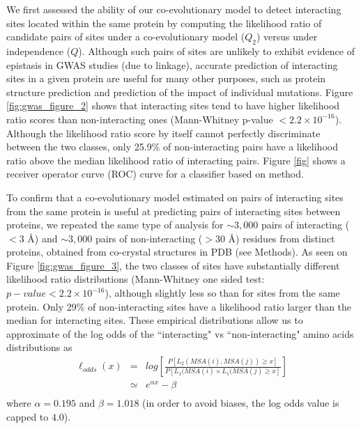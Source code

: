 We first assessed the ability of our co-evolutionary model to detect interacting sites located within the same protein by computing the likelihood ratio of candidate pairs of sites under a co-evolutionary model ($Q_2$) versus under independence ($Q$). 
Although such pairs of sites are unlikely to exhibit evidence of epistasis in GWAS studies (due to linkage), accurate prediction of interacting sites in a given protein are useful for many other purposes, such as protein structure prediction and prediction of the impact of individual mutations.  
Figure \ref{fig:gwas_figure_2} shows that interacting sites tend to have higher likelihood ratio scores than non-interacting ones (Mann-Whitney p-value $< 2.2 \times 10^{-16}$). 
Although the likelihood ratio score by itself cannot perfectly discriminate between the two classes, only 25.9\% of non-interacting pairs have a likelihood ratio above the median likelihood ratio of interacting pairs. 
Figure \ref{fig} shows a receiver operator curve (ROC) curve for a classifier based on method.




To confirm that a co-evolutionary model estimated on pairs of interacting sites from the same protein is useful at predicting pairs of interacting sites between proteins, we repeated the same type of analysis for $\sim3,000$ pairs of interacting ($< 3$ \r{A}) and $\sim3,000$ pairs of non-interacting ($>30$ \r{A}) residues from distinct proteins, obtained from co-crystal structures in PDB (see Methods). 
As seen on Figure \ref{fig:gwas_figure_3}, the two classes of sites have substantially different likelihood ratio distributions (Mann-Whitney one sided test: $p-value < 2.2 \times 10^{-16}$), although slightly less so than for sites from the same protein. Only 29\% of non-interacting sites have a likelihood ratio larger than the median for interacting sites. 
These empirical distributions allow us to approximate of the log odds of the ``interacting" vs ``non-interacting" amino acids distributions as
\begin{eqnarray*}
\ell_{odds}(x) & = & log\left[ \frac{P[ L_2(MSA(i), MSA(j)) \ge x ]}{P[ L_1(MSA(i) \times L_1(MSA(j) \ge x]} \right] \\
    & \simeq &e^{\alpha x}- \beta \\
\end{eqnarray*}
\noindent where $\alpha = 0.195$ and $\beta = 1.018$ (in order to avoid biases, the log odds value is capped to $4.0$).


